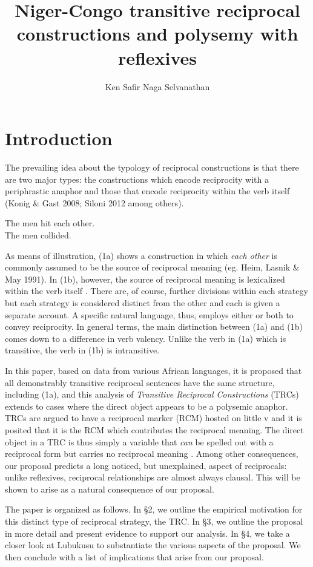 \documentclass[output=paper]{langsci/langscibook}
\title{Niger-Congo transitive reciprocal constructions and polysemy with reflexives}
\author{%
 Ken Safir\lastand 
 Naga Selvanathan \affiliation{Rutgers University} 
}
\begin{document}
\section{Introduction}

 The prevailing idea about the typology of reciprocal constructions is that there are two major types: the constructions which encode reciprocity with a periphrastic anaphor and those that encode reciprocity within the verb itself (Konig \& Gast 2008; Siloni 2012 among others).


\ea
\ea
The men hit each other.  \\
\ex
The men collided.\\
\z
\z

As means of illustration, (1a) shows a construction in which \textit{each other} is commonly assumed to be the source of reciprocal meaning (eg. Heim, Lasnik \& May 1991). In (1b), however, the source of reciprocal meaning is lexicalized within the verb itself \citep{Siloni2012}.  There are, of course, further divisions within each strategy but each strategy is considered distinct from the other and each is given a separate account. A specific natural language, thus, employs either or both to convey reciprocity. In general terms, the main distinction between (1a) and (1b) comes down to a difference in verb valency. Unlike the verb in (1a) which is transitive, the verb in (1b) is intransitive.
 
  In this paper, based on data from various African languages, it is proposed that all demonstrably transitive reciprocal sentences have the same structure, including (1a), and this analysis of \textit{Transitive Reciprocal Constructions} (TRCs) extends to cases where the direct object appears to be a polysemic anaphor. TRCs are argued to have a reciprocal marker (RCM) hosted on little v and it is posited that it is the RCM which contributes the reciprocal meaning. The direct object in a TRC is thus simply a variable that \textit{can} be spelled out with a reciprocal form but carries no reciprocal meaning \citep{Safir2014}. Among other consequences, our proposal predicts a long noticed, but unexplained, aspect of reciprocals: unlike reflexives, reciprocal relationships are almost always clausal. This will be shown to arise as a natural consequence of our proposal.
 
  The paper is organized as follows. In §2, we outline the empirical motivation for this distinct type of reciprocal strategy, the TRC. In §3, we outline the proposal in more detail and present evidence to support our analysis. In §4, we take a closer look at Lubukusu to substantiate the various aspects of the proposal. We then conclude with a list of implications that arise from our proposal.
 
\end{document}
